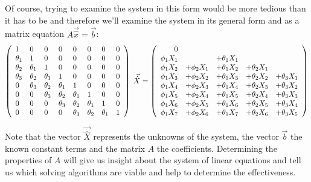Of course, trying to examine the system in this form would be more tedious than it has to be and therefore we'll examine the system in its general form and as a matrix equation $A \vec{\hat{x}} = \vec{b}$:
\begin{equation}\label{eq:ARMA_hat_2_3_system_big}
    \left(\begin{array}[c]{llllllll}
        1 & 0 & 0 & 0 & 0 & 0 & 0 & 0\\
        \theta_1 & 1 & 0 & 0 & 0 & 0 & 0 & 0\\
        \theta_2 & \theta_1& 1 & 0 & 0 & 0 & 0 & 0\\
        \theta_3 & \theta_2 & \theta_1& 1 & 0 & 0 & 0 & 0\\
        0 & \theta_3 & \theta_2 & \theta_1& 1 & 0 & 0 & 0\\
        0 & 0 & \theta_3 & \theta_2 & \theta_1& 1 & 0 & 0\\
        0 & 0 & 0 & \theta_3 & \theta_2 & \theta_1& 1 & 0\\
        0 & 0 & 0 & 0 & \theta_3 & \theta_2 & \theta_1& 1
    \end{array}\right)
    \;\vec{\hat{X}}=
    \left(\begin{array}[c]{rrrrr}
        0 &&&&\\ 
        \phi_1 X_1& &+\theta_1 X_{1} &&\\
        \phi_1 X_2 &+ \phi_2 X_1&+ \theta_1 X_{2} &+ \theta_2 X_{1} &\\
        \phi_1 X_3 &+ \phi_2 X_2&+ \theta_1 X_{3} &+ \theta_2 X_{2} &+ \theta_3 X_{1} \\
        \phi_1 X_4 &+ \phi_2 X_3&+ \theta_1 X_{4} &+ \theta_2 X_{3} &+ \theta_3 X_{2} \\
        \phi_1 X_5 &+ \phi_2 X_4&+ \theta_1 X_{5} &+ \theta_2 X_{4} &+ \theta_3 X_{3} \\
        \phi_1 X_6 &+ \phi_2 X_5&+ \theta_1 X_{6} &+ \theta_2 X_{5} &+ \theta_3 X_{4} \\
        \phi_1 X_7 &+ \phi_2 X_6&+ \theta_1 X_{7} &+ \theta_2 X_{6} &+ \theta_3 X_{5} \\
    \end{array}\right)
\end{equation}

Note that the vector $\vec{\hat{X}}$ represents the unknowns of the system, the vector $\vec{b}$ the known constant terms and the matrix $A$ the coefficients. Determining the properties of $A$ will give us insight about the system of linear equations and tell us which solving algorithms are viable and 
help to determine the effectiveness.

